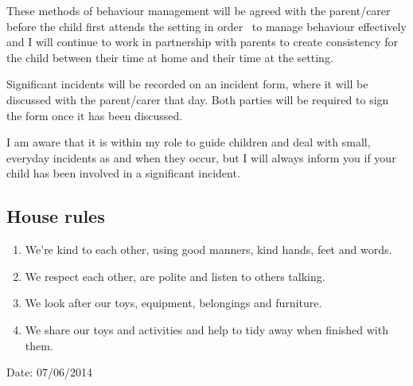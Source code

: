 These methods of behaviour management will be agreed with the
parent/carer before the child first attends the setting in order ~to
manage behaviour effectively and I will continue to work in partnership
with parents to create consistency for the child between their time at
home and their time at the setting.

Significant incidents will be recorded on an incident form, where it
will be discussed with the parent/carer that day. Both parties will be
required to sign the form once it has been discussed.

I am aware that it is within my role to guide children and deal with
small, everyday incidents as and when they occur, but I will always
inform you if your child has been involved in a significant incident.

\subsection{House rules}

\begin{enumerate}
\item
  We're kind to each other, using good manners, kind hands, feet and
  words. ~
\item
  We respect each other, are polite and listen to others talking.~
\item
  We look after our toys, equipment, belongings and furniture.~
\item
  We share our toys and activities and help to tidy away when finished
  with them.~
\end{enumerate}

Date: 07/06/2014


